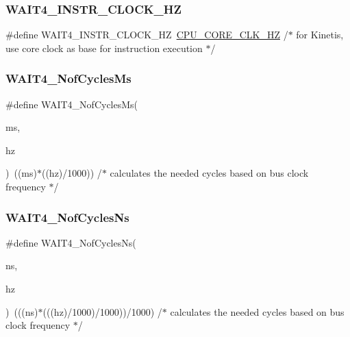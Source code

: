 \subsubsection{\texorpdfstring{W\+A\+I\+T4\+\_\+\+I\+N\+S\+T\+R\+\_\+\+C\+L\+O\+C\+K\+\_\+\+HZ}{WAIT4\_INSTR\_CLOCK\_HZ}}
{\footnotesize\ttfamily \#define W\+A\+I\+T4\+\_\+\+I\+N\+S\+T\+R\+\_\+\+C\+L\+O\+C\+K\+\_\+\+HZ~\hyperlink{group___cpu__module_ga9dee0abd722c849e54c662ab11a1d2cf}{C\+P\+U\+\_\+\+C\+O\+R\+E\+\_\+\+C\+L\+K\+\_\+\+HZ} /$\ast$ for Kinetis, use core clock as base for instruction execution $\ast$/}

\mbox{\label{group___w_a_i_t4__module_gad3a2ef0baed120ae0b28e75c71450967}} 
\subsubsection{\texorpdfstring{W\+A\+I\+T4\+\_\+\+Nof\+Cycles\+Ms}{WAIT4\_NofCyclesMs}}
{\footnotesize\ttfamily \#define W\+A\+I\+T4\+\_\+\+Nof\+Cycles\+Ms(\begin{DoxyParamCaption}\item[{}]{ms,  }\item[{}]{hz }\end{DoxyParamCaption})~((ms)$\ast$((hz)/1000)) /$\ast$ calculates the needed cycles based on bus clock frequency $\ast$/}

\mbox{\label{group___w_a_i_t4__module_ga2cce45996fd32a7ebfd37feb5c2e7a43}} 
\subsubsection{\texorpdfstring{W\+A\+I\+T4\+\_\+\+Nof\+Cycles\+Ns}{WAIT4\_NofCyclesNs}}
{\footnotesize\ttfamily \#define W\+A\+I\+T4\+\_\+\+Nof\+Cycles\+Ns(\begin{DoxyParamCaption}\item[{}]{ns,  }\item[{}]{hz }\end{DoxyParamCaption})~(((ns)$\ast$(((hz)/1000)/1000))/1000) /$\ast$ calculates the needed cycles based on bus clock frequency $\ast$/}

